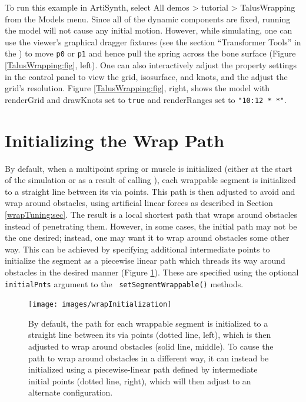 To run this example in ArtiSynth, select {\sf All demos > tutorial >
TalusWrapping} from the {\sf Models} menu. Since all of the dynamic
components are fixed, running the model will not cause any initial
motion. However, while simulating, one can use the viewer's graphical
dragger fixtures (see the section ``Transformer Tools'' in the
) to move
{\tt p0} or {\tt p1} and hence pull the spring across the bone surface
(Figure \ref{TalusWrapping:fig}, left). One can also interactively
adjust the property settings in the control panel to view the grid,
isosurface, and knots, and the adjust the grid's resolution.  Figure
\ref{TalusWrapping:fig}, right, shows the model with {\sf renderGrid}
and {\sf drawKnots} set to {\tt true} and {\sf renderRanges} set to
{\tt "10:12 * *"}.

\section{Initializing the Wrap Path}
\label{wrappingInit:sec}

By default, when a multipoint spring or muscle is initialized (either
at the start of the simulation or as a result of calling
), each
wrappable segment is initialized to a straight line between its via
points. This path is then adjusted to avoid and wrap around obstacles,
using artificial linear forces as described in Section
\ref{wrapTuning:sec}. The result is a local shortest path that wraps
around obstacles instead of penetrating them.  However, in some cases,
the initial path may not be the one desired; instead, one may want it
to wrap around obstacles some other way. This can be achieved by
specifying additional intermediate points to initialize the segment as
a piecewise linear path which threads its way around obstacles in the
desired manner (Figure \ref{wrapInitialization:fig}).  These are
specified using the optional {\tt initialPnts} argument to the {\tt
setSegmentWrappable()} methods.

\begin{figure}[ht]
\begin{center}
 \texttt{[image: images/wrapInitialization]}
\end{center}
\caption{By default, the path for each wrappable segment is
initialized to a straight line between its via points (dotted line,
left), which is then adjusted to wrap around obstacles (solid line,
middle). To cause the path to wrap around obstacles in a different
way, it can instead be initialized using a piecewise-linear
path defined by intermediate initial points (dotted line, right),
which will then adjust to an alternate configuration.}
\label{wrapInitialization:fig}
\end{figure}


